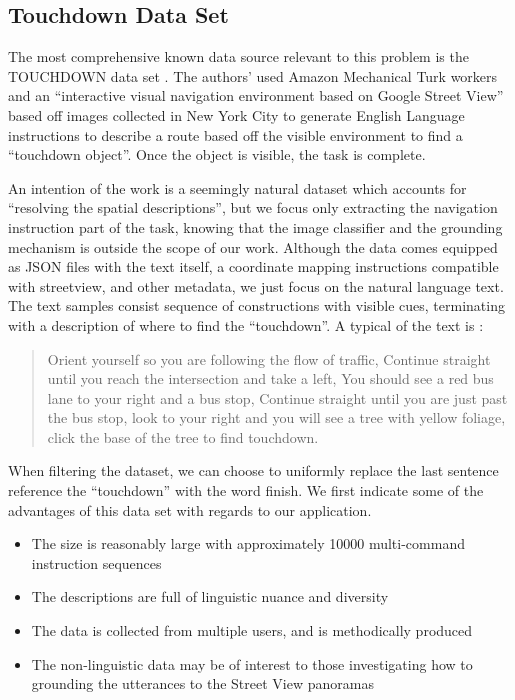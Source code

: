 \documentclass[a4paper, 11pt]{article}
\begin{document}
\subsection{Touchdown Data Set}

The most comprehensive known data source relevant to this problem is the
TOUCHDOWN data set \cite{chen2019touchdown}. The authors' used Amazon Mechanical
Turk workers and an ``interactive visual navigation environment based on Google
Street View'' based off images collected in New York City to generate English
Language instructions to describe a route based off the visible environment to
find a ``touchdown object''. Once the object is visible, the task is complete.

An intention of the work is a seemingly natural dataset which accounts for
``resolving the spatial descriptions'', but we focus only extracting the
navigation instruction part of the task, knowing that the image classifier and
the grounding mechanism is outside the scope of our work. Although the data
comes equipped as JSON files with the text itself, a coordinate mapping
instructions compatible with streetview, and other metadata, we just focus on
the natural language text. The text samples consist sequence of constructions with
visible cues, terminating with a description of where to find the ``touchdown''.
A typical of the text is :

\begin{quote}
Orient yourself so you are following the flow of traffic, Continue straight
until you reach the intersection and take a left, You should see a red bus lane
to your right and a bus stop, Continue straight until you are just past the bus
stop, look to your right and you will see a tree with yellow foliage, click the base of the tree to find touchdown.  
\end{quote}

When filtering the dataset, we can choose to uniformly replace the last sentence
reference the ``touchdown'' with the word finish. We first indicate some of the
advantages of this data set with regards to our application.

\begin{itemize}
\item The size is reasonably large with approximately 10000 multi-command instruction sequences
\item The descriptions are full of linguistic nuance and diversity 
\item The data is collected from multiple users, and is methodically produced
\item The non-linguistic data may be of interest to those investigating
how to grounding the utterances to the Street View panoramas
\end{itemize}
\end{document}
